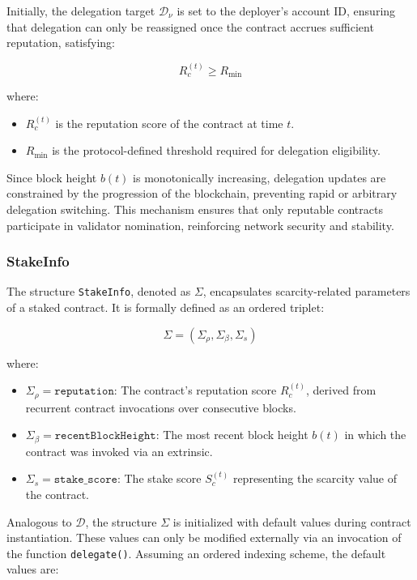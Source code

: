 \documentclass{article}
\begin{document}
Initially, the delegation target $\mathcal{D}_\nu$ is set to the deployer’s account ID, ensuring that delegation can only be reassigned once the contract accrues sufficient reputation, satisfying:

\begin{equation}
R_c^{(t)} \geq R_{\min}
\end{equation}

where:  
\begin{itemize}
    \item $R_c^{(t)}$ is the reputation score of the contract at time $t$.
    \item $R_{\min}$ is the protocol-defined threshold required for delegation eligibility.
\end{itemize}

Since block height $b(t)$ is monotonically increasing, delegation updates are constrained by the progression of the blockchain, preventing rapid or arbitrary delegation switching. This mechanism ensures that only reputable contracts participate in validator nomination, reinforcing network security and stability.

\subsubsection{StakeInfo}

The structure \texttt{StakeInfo}, denoted as $\Sigma$, encapsulates scarcity-related parameters of a staked contract. It is formally defined as an ordered triplet:

\begin{equation}
\Sigma = (\Sigma_\rho, \Sigma_\beta, \Sigma_s)
\end{equation}

where:
\begin{itemize}
    \item $\Sigma_\rho = \texttt{reputation}$: The contract's reputation score $R_c^{(t)}$, derived from recurrent contract invocations over consecutive blocks.
    \item $\Sigma_\beta = \texttt{recentBlockHeight}$: The most recent block height $b(t)$ in which the contract was invoked via an extrinsic.
    \item $\Sigma_s = \texttt{stake\_score}$: The stake score $S_c^{(t)}$ representing the scarcity value of the contract.
\end{itemize}

Analogous to $\mathcal{D}$, the structure $\Sigma$ is initialized with default values during contract instantiation. These values can only be modified externally via an invocation of the function \texttt{delegate()}. Assuming an ordered indexing scheme, the default values are:
\end{document}
